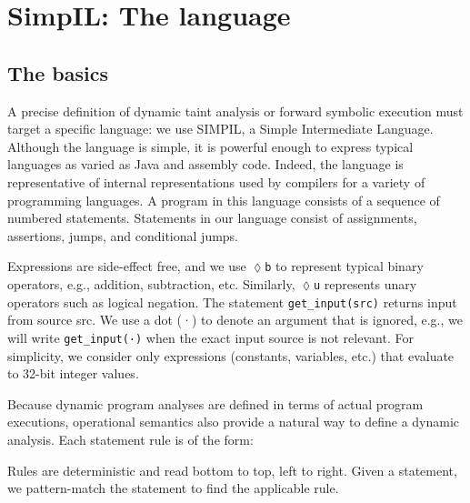 \section{SimpIL: The language}
\subsection{The basics}
A precise definition of dynamic taint analysis or forward symbolic execution must target a specific language: we use SIMPIL, a Simple Intermediate Language. Although the language is simple, it is powerful enough to express typical languages as varied as Java and assembly code. Indeed, the language is representative of internal representations used by compilers for a variety of programming languages. A program in this language consists of a sequence of numbered statements. Statements in our language consist of assignments, assertions, jumps, and conditional jumps.

Expressions are side-effect free, and we use \texttt{$\lozenge$b} to represent typical binary operators, e.g., addition, subtraction, etc. Similarly, \texttt{$\lozenge$u} represents unary operators such as logical negation. The statement \texttt{get\_input(src)} returns input from source src. We use a dot (·) to denote an argument that is ignored, e.g., we will write \texttt{get\_input(·)} when the exact input source is not relevant. For simplicity, we consider only expressions (constants, variables, etc.) that evaluate to 32-bit integer values.

Because dynamic program analyses are defined in terms of actual program executions, operational semantics also provide a natural way to define a dynamic analysis. Each statement rule is of the form:
\begin{prooftree}
\end{prooftree}
Rules are deterministic and read bottom to top, left to right. Given a statement, we pattern-match the statement to find the applicable rule.
